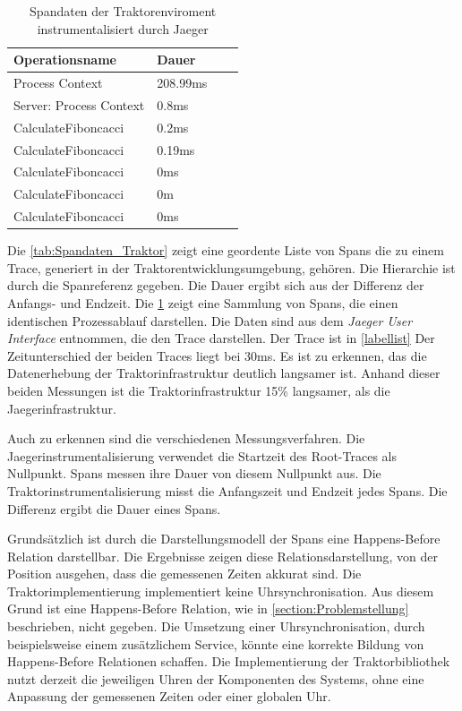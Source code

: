 \begin{table}[]
	\centering
	\begin{tabular}{|l|l|l|l|}
		\hline
		Operationsname          & Dauer 	\\ \hline
		Process Context         & 208.99ms  \\ \hline
		Server: Process Context & 0.8ms 	\\ \hline
		CalculateFiboncacci     & 0.2ms 	\\ \hline
		CalculateFiboncacci     & 0.19ms 	\\ \hline
		CalculateFiboncacci     & 0ms		\\ \hline
		CalculateFiboncacci     & 0m		\\ \hline
		CalculateFiboncacci     & 0ms		\\ \hline
	\end{tabular}
	\caption{Spandaten der Traktorenviroment instrumentalisiert durch Jaeger}
	\label{tab:Spandaten_Jaeger}
\end{table}
Die \cref{tab:Spandaten_Traktor} zeigt eine geordente Liste von Spans die zu einem Trace, generiert in der Traktorentwicklungsumgebung, gehören. Die Hierarchie ist durch die Spanreferenz gegeben. Die Dauer ergibt sich aus der Differenz der Anfangs- und Endzeit. Die \cref{tab:Spandaten_Jaeger} zeigt eine Sammlung von Spans, die einen identischen Prozessablauf darstellen. Die Daten sind aus dem \emph{Jaeger User Interface} entnommen, die den Trace darstellen. Der Trace ist in \cref{labellist}
Der Zeitunterschied der beiden Traces liegt bei 30ms. Es ist zu erkennen, das die Datenerhebung der Traktorinfrastruktur deutlich langsamer ist. Anhand dieser beiden Messungen ist die Traktorinfrastruktur 15\% langsamer, als die Jaegerinfrastruktur.

Auch zu erkennen sind die verschiedenen Messungsverfahren. Die Jaegerinstrumentalisierung verwendet die Startzeit des Root-Traces als Nullpunkt. Spans messen ihre Dauer von diesem Nullpunkt aus. Die Traktorinstrumentalisierung misst die Anfangszeit und Endzeit jedes Spans. Die Differenz ergibt die Dauer eines Spans.

Grundsätzlich ist durch die Darstellungsmodell der Spans eine Happens-Before Relation darstellbar. Die Ergebnisse zeigen diese Relationsdarstellung, von der Position ausgehen, dass die gemessenen Zeiten akkurat sind.  Die Traktorimplementierung implementiert keine Uhrsynchronisation. Aus diesem Grund ist eine Happens-Before Relation, wie in \cref{section:Problemstellung} beschrieben, nicht gegeben. Die Umsetzung einer Uhrsynchronisation, durch beispielsweise einem zusätzlichem Service, könnte eine korrekte Bildung von Happens-Before Relationen schaffen. Die Implementierung der Traktorbibliothek nutzt derzeit die jeweiligen Uhren der Komponenten des Systems, ohne eine Anpassung der gemessenen Zeiten oder einer globalen Uhr.

